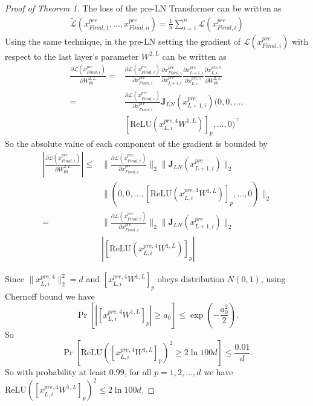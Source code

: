 \documentclass{article}
\begin{document}
\begin{proof}[Proof of Theorem 1]
The loss of the pre-LN Transformer can be written as
\begin{align}
\tilde{\mathcal{L}}(x_{Final,1}^{pre},...,x_{Final,n}^{pre})=\frac{1}{n}\sum_{i=1}^n \mathcal{L}(x_{Final,i}^{pre})
\end{align}
Using the same technique, in the pre-LN setting the gradient of $\mathcal{L}(x_{Final,i}^{pre})$ with respect to the last layer's parameter $W^{2,L}$ can be written as
\begin{align}
\frac{\partial \mathcal{L}(x_{Final,i}^{pre})}{\partial W^{2,L}_{pq}}
=&\frac{\partial \mathcal{L}(x_{Final,i}^{pre})}{\partial x_{Final,i}^{pre}}
\frac{\partial x_{Final,i}^{pre}}{\partial x_{L+1,i}^{pre}}
\frac{\partial x_{L+1,i}^{pre}}{\partial x_{L,i}^{pre,5}}
\frac{\partial x_{L,i}^{pre,5}}{\partial W^{2,L}_{pq}}\\
=&\frac{\partial \mathcal{L}(x_{Final,i}^{pre})}{\partial x_{Final,i}^{pre}}\mathbf{J}_{LN}(x_{L+1,i}^{pre})(0,0,...,\nonumber\\
&[\text{ReLU}(x_{L,i}^{pre,4}W^{1,L})]_p,...,0)^{\top}
\end{align}
So the absolute value of each component of the gradient is bounded by
\begin{align}
|\frac{\partial \mathcal{L}(x_{Final,i}^{pre})}{\partial W^{2,L}_{pq}}|\leq &\|\frac{\partial \mathcal{L}(x_{Final,i}^{pre})}{\partial x_{Final,i}^{pre}}\|_2\|\mathbf{J}_{LN}(x_{L+1,i}^{pre})\|_2\nonumber\\
&\|(0,0,...,[\text{ReLU}(x_{L,i}^{pre,4}W^{1,L})]_p,...,0)\|_2\\
=&\|\frac{\partial \mathcal{L}(x_{Final,i}^{pre})}{\partial x_{Final,i}^{pre}}\|_2\|\mathbf{J}_{LN}(x_{L+1,i}^{pre})\|_2\nonumber\\
&|[\text{ReLU}(x_{L,i}^{pre,4}W^{1,L})]_p|
\end{align}

Since $\| x_{L,i}^{pre,4}\|_2^2=d$ and $[ x_{L,i}^{pre,4}W^{1,L}]_p$ obeys distribution $N(0,1)$, using Chernoff bound we have
$$\operatorname{Pr}[|[ x_{L,i}^{pre,4}W^{1,L}]_p|\geq a_0]\leq \operatorname{exp}(-\frac{a_0^2}{2}).$$
So $$\operatorname{Pr}[\text{ReLU}([ x_{L,i}^{pre,4}W^{1,L}]_p)^2\geq 2\ln{100d}]\leq \frac{0.01}{d}.$$
So with probability at least $0.99$, for all $p=1,2,...,d$ we have $\text{ReLU}([ x_{L,i}^{pre,4}W^{1,L}]_p)^2\leq 2\ln{100d}$.


\end{proof}
\end{document}

